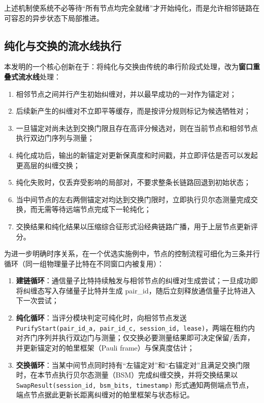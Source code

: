 \documentclass[12pt,a4paper]{article}
\begin{document}
上述机制使系统不必等待“所有节点均完全就绪”才开始纯化，而是允许相邻链路在可容忍的异步状态下局部推进。

\subsection{纯化与交换的流水线执行}

本发明的一个核心创新在于：将纯化与交换由传统的串行阶段式处理，改为\textbf{窗口重叠式流水线}处理：
\begin{enumerate}[label=\textbf{S\arabic*.}]
    \item 相邻节点之间并行产生初始纠缠对，并以最早成功的一对作为锚定对；
    \item 后续新产生的纠缠对不立即平等缓存，而是按评分规则标记为候选牺牲对；
    \item 一旦锚定对尚未达到交换门限且存在高评分候选对，则在当前节点和相邻节点执行双边门序列与测量；
    \item 纯化成功后，输出的新锚定对更新保真度和时间戳，并立即评估是否可以发起更高层的纠缠交换；
    \item 纯化失败时，仅丢弃受影响的局部对，不要求整条长链路回退到初始状态；
    \item 当中间节点的左右两侧锚定对均达到交换门限时，立即执行贝尔态测量完成交换，而无需等待远端节点完成下一轮纯化；
    \item 交换结果和纯化结果以压缩综合征形式沿经典链路广播，用于上层节点更新评分。
\end{enumerate}

为进一步明确时序关系，在一个优选实施例中，节点的控制流程可细化为三条并行循环（同一组物理量子比特在不同窗口内被复用）：
\begin{enumerate}[label=(\arabic*)]
    \item \textbf{建链循环}：通信量子比特持续触发与相邻节点的纠缠对生成尝试；一旦成功即将纠缠态写入存储量子比特并生成 pair\_id，随后立刻释放通信量子比特进入下一次尝试；
    \item \textbf{纯化循环}：当评分模块判定可纯化时，向相邻节点发送 \texttt{PurifyStart(pair\_id\_a, pair\_id\_c, session\_id, lease)}，两端在租约内对齐门序列并执行双边门与测量；仅交换必要测量结果即可决定保留/丢弃，并更新锚定对的帕里框架（Pauli frame）与保真度估计；
    \item \textbf{交换循环}：当某中间节点同时持有“左锚定对”和“右锚定对”且满足交换门限时，在本节点执行贝尔态测量（BSM）完成纠缠交换，并将交换结果以 \texttt{SwapResult(session\_id, bsm\_bits, timestamp)} 形式通知两侧端点节点，端点节点据此更新长距离纠缠对的帕里框架与状态标记。
\end{enumerate}
\end{document}
